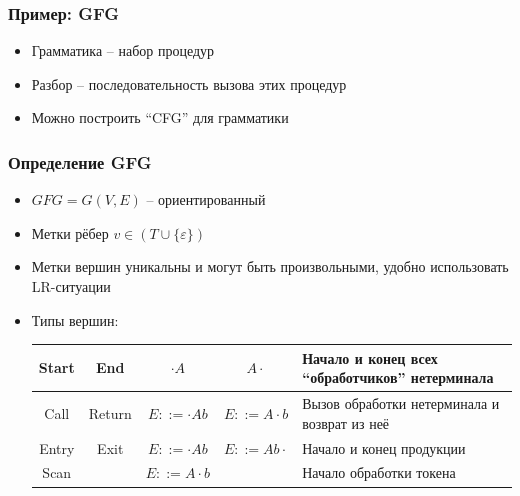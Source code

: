 \documentclass{beamer}
\begin{document}
\begin{frame}
    \transwipe[direction=90]
    \frametitle{Пример: GFG}
    \begin{itemize}
        \item Грамматика -- набор процедур
        \item Разбор -- последовательность вызова этих процедур
        \item Можно построить ``CFG'' для грамматики
    \end{itemize}
\end{frame}

\begin{frame}
    \transwipe[direction=90]
    \frametitle{Определение GFG}
    \begin{itemize}
       \item $GFG = G(V,E)$ -- ориентированный
       \item Метки рёбер $ v \in (T\cup \{ \varepsilon \}) $
        \item Метки вершин уникальны и могут быть произвольными, удобно использовать LR-ситуации
        \item Типы вершин:
        \begin{tabular}{|c|c|c|c|p{4cm}|} 
            \hline
            Start & End & $\cdot A$ & $A \cdot$ & Начало и конец всех ``обработчиков'' нетерминала  \\
            \hline
            Call & Return & $E ::= \cdot Ab$ & $E ::= A \cdot b$ & Вызов обработки нетерминала и возврат из неё \\
            \hline
            Entry & Exit & $E ::= \cdot Ab$ & $E ::= Ab \cdot$ & Начало и конец продукции                      \\
            \hline
            Scan &       & $E ::= A \cdot b$ &  & Начало обработки токена                                  \\
            \hline
        \end{tabular}
    \end{itemize}
\end{frame}
\end{document}
